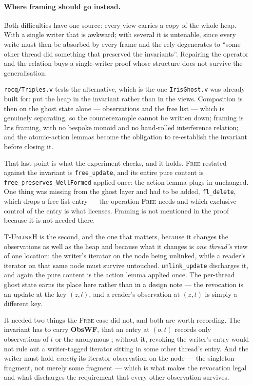 \paragraph{Where framing should go instead.}  Both difficulties have one
source: every view carries a copy of the whole heap.  With a single writer that
is awkward; with several it is untenable, since every write must then be
absorbed by every frame and the rely degenerates to ``some other thread did
something that preserved the invariants''.  Repairing the operator and the
relation buys a single-writer proof whose structure does not survive the
generalisation.

\texttt{rocq/Triples.v} tests the alternative, which is the one
\texttt{IrisGhost.v} was already built for: put the heap in the invariant rather
than in the views.  Composition is then on the ghost state alone --- observations
and the free list --- which is genuinely separating, so the counterexample
cannot be written down; framing is Iris framing, with no bespoke monoid and no
hand-rolled interference relation; and the atomic-action lemmas become the
obligation to re-establish the invariant before closing it.

That last point is what the experiment checks, and it holds.  \textsc{Free}
restated against the invariant is \texttt{free\_update}, and its entire pure
content is \texttt{free\_preserves\_WellFormed} applied once: the action lemma
plugs in unchanged.  One thing was missing from the ghost layer and had to be
added, \texttt{fl\_delete}, which drops a free-list entry --- the operation
\textsc{Free} needs and which exclusive control of the entry is what licenses.
Framing is not mentioned in the proof because it is not needed there.

\textsc{T-UnlinkH} is the second, and the one that matters, because it changes
the observations as well as the heap and because what it changes is \emph{one
thread's} view of one location: the writer's iterator on the node being
unlinked, while a reader's iterator on that same node must survive untouched.
\texttt{unlink\_update} discharges it, and again the pure content is the action
lemma applied once.  The per-thread ghost state earns its place here rather than
in a design note --- the revocation is an update at the key $(z, l)$, and a
reader's observation at $(z, t)$ is simply a different key.

It needed two things the \textsc{Free} case did not, and both are worth
recording.  The invariant has to carry \textbf{ObsWF}, that an entry at $(o,t)$
records only observations of $t$ or the anonymous \rt{}; without it, revoking
the writer's entry would not rule out a writer-tagged iterator sitting in some
other thread's entry.  And the writer must hold \emph{exactly} its iterator
observation on the node --- the singleton fragment, not merely some fragment ---
which is what makes the revocation legal and what discharges the requirement
that every other observation survives.

